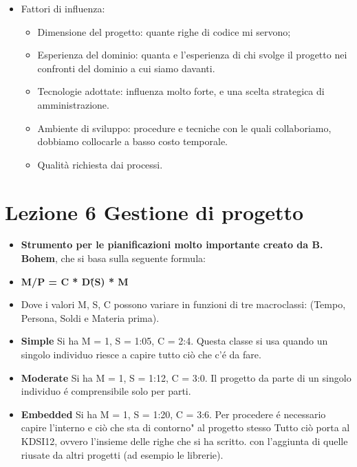 \documentclass[a4paper,10pt] {article}
\begin{document}
\begin{itemize}
\begin{itemize}
\begin{itemize}
\item Fattori di influenza:
\begin{itemize}
	
	\item Dimensione del progetto: quante righe di codice mi servono; 
	
    \item Esperienza del dominio: quanta e l'esperienza di chi svolge il 
    progetto nei confronti del dominio a cui siamo davanti.
    
	\item Tecnologie adottate: influenza molto forte, e una scelta strategica 
	di amministrazione.
	
	\item Ambiente di sviluppo: procedure e tecniche con le quali collaboriamo, 
	dobbiamo collocarle a basso costo temporale.

 	\item Qualità richiesta dai processi.
 	
\end{itemize}
\end{itemize}
\end{itemize}

\section{Lezione 6 Gestione di progetto}

\begin{itemize}
\item \textbf{Strumento per le pianificazioni molto importante creato da B. 
Bohem}, che si basa sulla seguente formula:

	\item \textbf{M/P = C * D\^(S) * M}

\item Dove i valori M, S, C possono variare in funzioni di tre macroclassi:
(Tempo, Persona, Soldi e Materia prima).

\item \textbf{Simple} Si ha M = 1, S = 1:05, C = 2:4. Questa classe si usa 
quando un singolo individuo riesce a capire tutto ciò che c'é da fare.


\item \textbf{Moderate} Si ha M = 1, S = 1:12, C = 3:0. Il progetto da parte di
un singolo individuo é comprensibile solo per parti.

\item \textbf{Embedded} Si ha M = 1, S = 1:20, C = 3:6. Per procedere é
necessario capire l'interno e ciò che sta di contorno" al progetto stesso
Tutto ciò porta al KDSI12, ovvero l'insieme delle righe che si ha scritto.
con l'aggiunta di quelle riusate da altri progetti (ad esempio le librerie).
\end{itemize}


\end{itemize}
\end{document}

